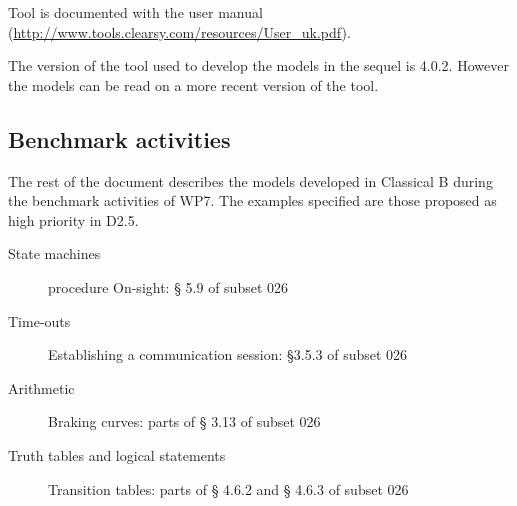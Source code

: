 Tool is documented with the user manual (\url{http://www.tools.clearsy.com/resources/User_uk.pdf}). 

The version of the tool used to develop the models in the sequel is 4.0.2.
However the models can be read on a more recent version of the tool.

\subsection{Benchmark activities}

The rest of the document describes the models developed in Classical B during the benchmark activities of WP7. The examples specified are those proposed as high priority in D2.5.

\begin{description}
\item[State machines] procedure On-sight: § 5.9 of subset 026
\item[Time-outs] Establishing a communication session: §3.5.3 of subset 026
\item[Arithmetic] Braking curves: parts of § 3.13 of subset 026
\item[Truth tables and logical statements] Transition tables: parts of § 4.6.2 and § 4.6.3 of subset 026 
\end{description}
